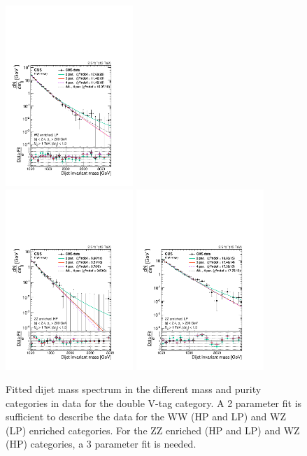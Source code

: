 \begin{figure}[htb]
\includegraphics[width=0.43\textwidth]{figures/analysis/search1/AN-15-211//ftest/no5par/WZLP_fitComp.pdf}\\
\includegraphics[width=0.43\textwidth]{figures/analysis/search1/AN-15-211//ftest/no5par/ZZHP_fitComp.pdf}
\includegraphics[width=0.43\textwidth]{figures/analysis/search1/AN-15-211//ftest/no5par/ZZLP_fitComp.pdf}\\
\caption{Fitted dijet mass spectrum in the different mass and purity categories in data for the double V-tag category. A 2 parameter fit is sufficient to describe the data for the WW (HP and LP) and WZ (LP) enriched categories. For the ZZ enriched (HP and LP) and WZ (HP) categories, a 3 parameter fit is needed.}
\label{fig:searchI:fit-dataVV}
\end{figure}


